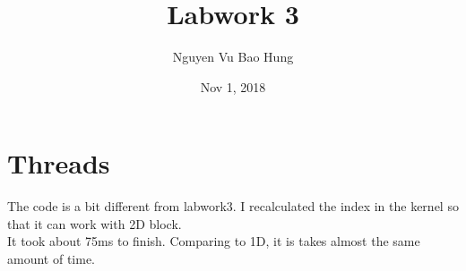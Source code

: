 \documentclass{article}
\title{Labwork 3}
\author{Nguyen Vu Bao Hung}
\date{Nov 1, 2018}
\begin{document}
\maketitle

\section{Threads}
The code is a bit different from labwork3. I recalculated the index in the kernel so that it can work with 2D block.\\
It took about 75ms to finish. Comparing to 1D, it is takes almost the same amount of time.
\end{document}
